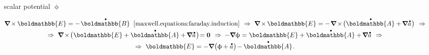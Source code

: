 scalar potential $\upphi$

\nopagebreak\begin{multline}
\boldnabla \hspace{-0.15ex} \times \hspace{-0.1ex} \boldmathbb{E} = - \hspace{.2ex} \mathdotabove{\boldmathbb{B}}
\;\;\eqref{maxwell.equations:faraday.induction}
\hspace{.4em} \Rightarrow \hspace{.3em}
\boldnabla \hspace{-0.15ex} \times \hspace{-0.1ex} \boldmathbb{E} = - \hspace{.2ex} \boldnabla \hspace{-0.15ex} \times \hspace{-0.3ex} \bigl( \mathdotabove{\boldmathbb{A}} + \hspace{-0.2ex} \boldnabla \mathdotabove{a} \hspace{.15ex} \bigr)
\hspace{.4em} \Rightarrow
\\[-0.1em]
\Rightarrow \hspace{.3em}
\boldnabla \hspace{-0.15ex} \times \hspace{-0.3ex} \bigl( \hspace{.1ex} \boldmathbb{E} + \mathdotabove{\boldmathbb{A}} + \hspace{-0.2ex} \boldnabla \mathdotabove{a} \hspace{.15ex} \bigr) \hspace{-0.4ex} = \bm{0}
\hspace{.4em} \Rightarrow \hspace{.25em}
- \boldnabla \upphi = \hspace{.1ex} \boldmathbb{E} + \mathdotabove{\boldmathbb{A}} + \hspace{-0.2ex} \boldnabla \mathdotabove{a}
\hspace{.4em} \Rightarrow
\\[-0.1em]
\Rightarrow \hspace{.33em}
\boldmathbb{E} = - \boldnabla \hspace{.1ex} \bigl( \upphi \hspace{-0.1ex} + \mathdotabove{a} \hspace{.1ex} \bigr) \hspace{-0.3ex} - \mathdotabove{\boldmathbb{A}}
\hspace{.2ex} .
\end{multline}

